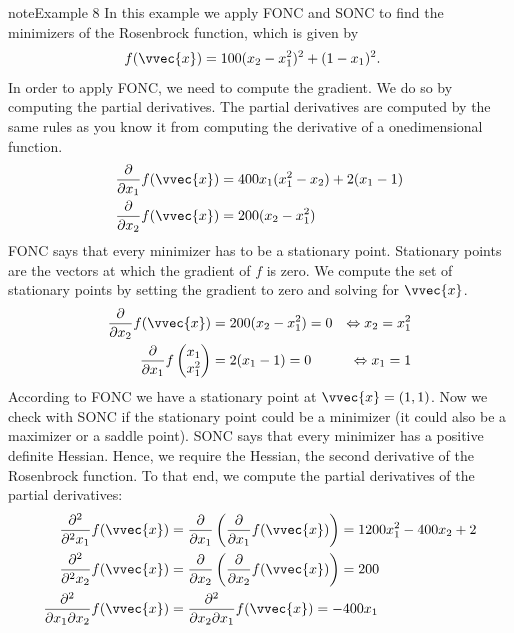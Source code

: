 \documentclass[letterpaper,10pt,english]{jupyterBook}
\begin{document}
\begin{sphinxadmonition}{note}{Example 8}
\sphinxAtStartPar
In this example we apply FONC and SONC to find the minimizers of the Rosenbrock function, which is given by
\begin{align*}
    f(\vvec{x})&= 100(x_2-x_1^2)^2 +(1-x_1)^2.
\end{align*}
\sphinxAtStartPar
In order to apply FONC, we need to compute the gradient. We do so by computing the partial derivatives. The partial derivatives are computed by the same rules as you know it from computing the derivative of a one\sphinxhyphen{}dimensional function.
\begin{align*}
    \frac{\partial}{\partial x_1}f(\vvec{x})&= 400x_1(x_1^2-x_2) +2(x_1-1)\\
    \frac{\partial}{\partial x_2}f(\vvec{x})&= 200(x_2-x_1^2)
\end{align*}
\sphinxAtStartPar
FONC says that every minimizer has to be a stationary point. Stationary points are the vectors at which the gradient of \(f\) is zero. We compute the set of stationary points by setting the gradient to zero and solving for \(\vvec{x}\).
\begin{align*}
      \frac{\partial}{\partial x_2}f(\vvec{x})&=200(x_2-x_1^2)=0
      &\Leftrightarrow x_2 =x_1^2\\
      \frac{\partial}{\partial x_1}f\begin{pmatrix}x_1\\x_1^2\end{pmatrix}&= 2(x_1-1) =0 
      &\Leftrightarrow x_1=1
\end{align*}
\sphinxAtStartPar
According to FONC we have a stationary point at \(\vvec{x}=(1,1)\). Now we check with SONC if the stationary point could be a minimizer (it could also be a maximizer or a saddle point). SONC says that every minimizer has a positive definite Hessian. Hence, we require the Hessian, the second derivative of the Rosenbrock function. To that end, we compute the partial derivatives of the partial derivatives:
\begin{align*}
\frac{\partial^2}{\partial^2 x_1}f(\vvec{x})&= \frac{\partial}{\partial x_1}\left(\frac{\partial}{\partial x_1}f(\vvec{x})\right)= 1200x_1^2-400x_2 +2\\
\frac{\partial^2}{\partial^2 x_2}f(\vvec{x})&=  \frac{\partial}{\partial x_2} \left(\frac{\partial}{\partial x_2}f(\vvec{x})\right)= 200\\
\frac{\partial^2}{\partial x_1\partial x_2}f(\vvec{x})&=\frac{\partial^2}{\partial x_2\partial x_1}f(\vvec{x})= -400x_1
\end{align*}

\end{sphinxadmonition}
\end{document}
